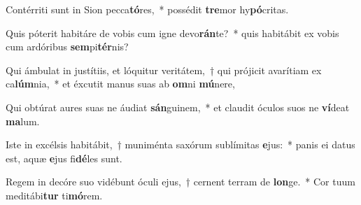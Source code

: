 \item Contérriti sunt in Sion pecca\textbf{tó}res,~* possédit \textbf{tre}mor hy\textbf{pó}critas.
\item Quis póterit habitáre de vobis cum igne devo\textbf{rán}te?~* quis habitábit ex vobis cum ardóribus \textbf{sem}pi\textbf{tér}nis?
\item Qui ámbulat in justítiis, et lóquitur veritátem,~† qui prójicit avarítiam ex ca\textbf{lúm}nia,~* et éxcutit manus suas ab \textbf{om}ni \textbf{mú}nere,
\item Qui obtúrat aures suas ne áudiat \textbf{sán}guinem,~* et claudit óculos suos ne \textbf{ví}deat \textbf{ma}lum.
\item Iste in excélsis habitábit,~† muniménta saxórum sublímitas \textbf{e}jus:~* panis ei datus est, aquæ \textbf{e}jus fi\textbf{dé}les sunt.
\item Regem in decóre suo vidébunt óculi ejus,~† cernent terram de \textbf{lon}ge.~* Cor tuum meditábi\textbf{tur} ti\textbf{mó}rem.
